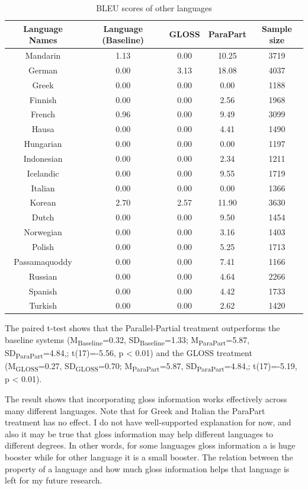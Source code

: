 \documentclass[final]{ua-thesis}
\numberwithin{equation}{section}
\begin{document}
\begin{table}[ht]
\centering
\begin{tabular}{ccccc}
  \hline
Language Names & Language (Baseline) & GLOSS & ParaPart & Sample size \\ 
  \hline
Mandarin & 1.13 & 0.00 & 10.25 & 3719 \\ 
  German & 0.00 & 3.13 & 18.08 & 4037 \\ 
  Greek & 0.00 & 0.00 & 0.00 & 1188 \\ 
  Finnish & 0.00 & 0.00 & 2.56 & 1968 \\ 
  French & 0.96 & 0.00 & 9.49 & 3099 \\ 
  Hausa & 0.00 & 0.00 & 4.41 & 1490 \\ 
  Hungarian & 0.00 & 0.00 & 0.00 & 1197 \\ 
  Indonesian & 0.00 & 0.00 & 2.34 & 1211 \\ 
  Icelandic & 0.00 & 0.00 & 9.55 & 1719 \\ 
  Italian & 0.00 & 0.00 & 0.00 & 1366 \\ 
  Korean & 2.70 & 2.57 & 11.90 & 3630 \\ 
  Dutch & 0.00 & 0.00 & 9.50 & 1454 \\ 
  Norwegian & 0.00 & 0.00 & 3.16 & 1403 \\ 
  Polish & 0.00 & 0.00 & 5.25 & 1713 \\ 
  Passamaquoddy & 0.00 & 0.00 & 7.41 & 1166 \\ 
  Russian & 0.00 & 0.00 & 4.64 & 2266 \\ 
  Spanish & 0.00 & 0.00 & 4.42 & 1733 \\ 
  Turkish & 0.00 & 0.00 & 2.62 & 1420 \\ 
   \hline
\end{tabular}
\caption{BLEU scores of other languages} 
\label{Table:Other_LG_BLEU}
\end{table}
\newpage
The paired t-test shows that the Parallel-Partial treatment outperforms the baseline systems 
(M\textsubscript{Baseline}=0.32, SD\textsubscript{Baseline}=1.33; M\textsubscript{ParaPart}=5.87, SD\textsubscript{ParaPart}=4.84,; t(17)=-5.56, p < 0.01) and the GLOSS treatment 
(M\textsubscript{GLOSS}=0.27, SD\textsubscript{GLOSS}=0.70; M\textsubscript{ParaPart}=5.87, SD\textsubscript{ParaPart}=4.84,; t(17)=-5.19, p < 0.01).


The result shows that incorporating gloss information works effectively across many different languages. Note that for Greek and Italian the ParaPart treatment has no effect. I do not have well-supported explanation for now, and also it may be true that gloss information may help different languages to different degrees. In other words, for some languages gloss information a is huge booster while for other language it is a small booster. The relation between the property of a language and how much gloss information helps that language is left for my future research.     
\end{document}
